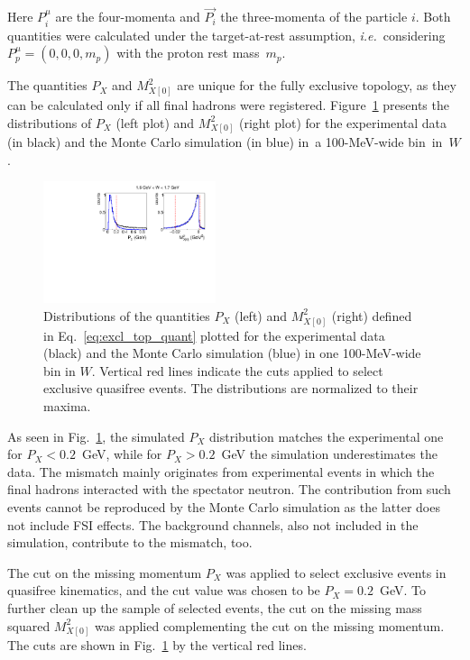 \documentclass[prc,twocolumn,superscriptaddress,showpacs,amssymb,amsmath,amsfonts,aps,nofootinbib]{revtex4-1}
\begin{document}
Here $P_{i}^{\mu}$ are the four-momenta and $\overrightarrow{P_{i}}$ the three-momenta of the particle $i$. Both quantities were calculated under the target-at-rest assumption, {\it i.e.}~considering $P^{\mu}_{p} = (0,0,0,m_{p})$ with the proton rest mass~$m_{p}$.


The quantities $P_{X}$ and $M^{2}_{X[0]}$ are unique for the fully exclusive topology, as they can be calculated only if all final hadrons were registered. Figure~\ref{fig:excl_top_cut} presents the distributions of $P_{X}$ (left plot) and $M^{2}_{X[0]}$ (right plot) for the experimental data (in black) and the Monte Carlo simulation (in blue) in~a 100-MeV-wide bin~in~$W$. 


\begin{figure}[htp]
\begin{center}
\includegraphics[width=0.45\textwidth,keepaspectratio]{pictures/event_selection/excl_cut_fully_extop2.pdf}
\caption{Distributions of the quantities $P_{X}$ (left) and $M^{2}_{X[0]}$ (right) defined in Eq.\!~\eqref{eq:excl_top_quant} plotted for the experimental data (black) and the Monte Carlo simulation (blue) in one 100-MeV-wide bin in $W$. Vertical red lines indicate the cuts applied to select exclusive quasifree events. The distributions are normalized to their maxima.}
\label{fig:excl_top_cut}
\end{center}
\end{figure}


As seen in Fig.\!~\ref{fig:excl_top_cut}, the simulated $P_{X}$ distribution matches the experimental one for $P_{X} < 0.2$~GeV, while for $P_{X} > 0.2$~GeV the simulation underestimates the data. The mismatch mainly originates from experimental events in which the final hadrons interacted with the spectator neutron. The contribution from such events cannot be reproduced by the Monte Carlo simulation as the latter does not include FSI effects. The background channels, also not included in the simulation, contribute to the mismatch, too. 


The cut on the missing momentum $P_{X}$ was applied to select exclusive events in quasifree kinematics, and the cut value was chosen to be $P_{X} = 0.2$~GeV. To further clean up the sample of selected events, the cut on the missing mass squared $M^{2}_{X[0]}$ was applied complementing the cut on the missing momentum. The cuts are shown in Fig.\!~\ref{fig:excl_top_cut} by the vertical red lines.
\end{document}
